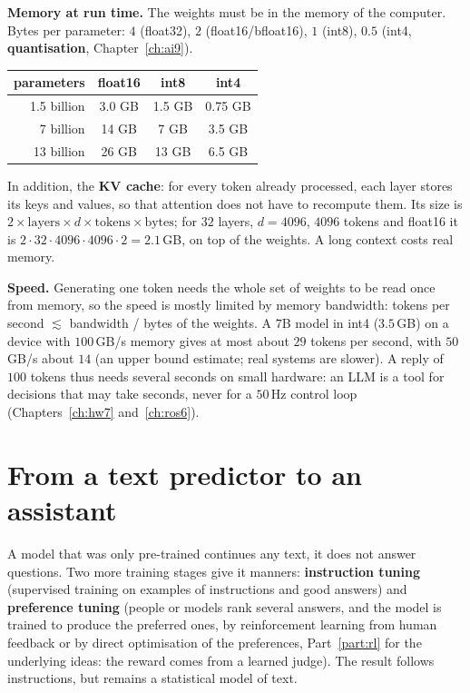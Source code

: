 \textbf{Memory at run time.} The weights must be in the memory of the computer. Bytes per parameter: $4$ (float32), $2$ (float16/bfloat16), $1$ (int8), $0.5$ (int4, \textbf{quantisation}, Chapter~\ref{ch:ai9}).
\begin{center}
\renewcommand{\arraystretch}{1.2}
\begin{tabular}{rccc}
\textbf{parameters} & \textbf{float16} & \textbf{int8} & \textbf{int4}\\ \hline
1.5 billion & 3.0 GB & 1.5 GB & 0.75 GB\\
7 billion & 14 GB & 7 GB & 3.5 GB\\
13 billion & 26 GB & 13 GB & 6.5 GB\\
\end{tabular}
\end{center}
In addition, the \textbf{KV cache}: for every token already processed, each layer stores its keys and values, so that attention does not have to recompute them. Its size is $2\times\text{layers}\times d\times\text{tokens}\times\text{bytes}$; for $32$ layers, $d=4096$, $4096$ tokens and float16 it is $2\cdot32\cdot4096\cdot4096\cdot2=2.1$\,GB, on top of the weights. A long context costs real memory.

\textbf{Speed.} Generating one token needs the whole set of weights to be read once from memory, so the speed is mostly limited by memory bandwidth: tokens per second $\lesssim$ bandwidth / bytes of the weights. A $7$B model in int4 ($3.5$\,GB) on a device with $100$\,GB/s memory gives at most about $29$ tokens per second, with $50$\,GB/s about $14$ (an upper bound estimate; real systems are slower). A reply of $100$ tokens thus needs several seconds on small hardware: an LLM is a tool for decisions that may take seconds, never for a $50$\,Hz control loop (Chapters~\ref{ch:hw7} and~\ref{ch:ros6}).

\section*{From a text predictor to an assistant}
A model that was only pre-trained continues any text, it does not answer questions. Two more training stages give it manners: \textbf{instruction tuning} (supervised training on examples of instructions and good answers) and \textbf{preference tuning} (people or models rank several answers, and the model is trained to produce the preferred ones, by reinforcement learning from human feedback or by direct optimisation of the preferences, Part~\ref{part:rl} for the underlying ideas: the reward comes from a learned judge). The result follows instructions, but remains a statistical model of text.

